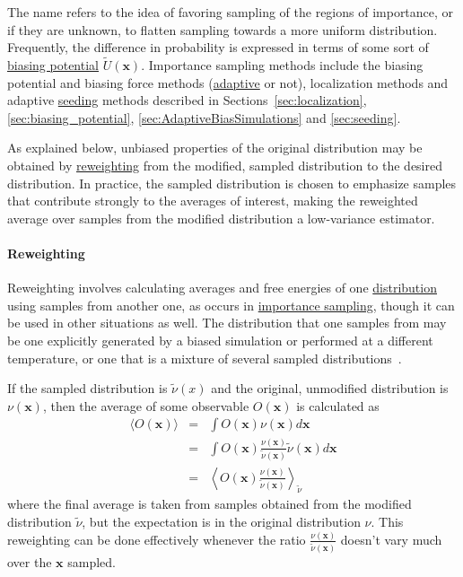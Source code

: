 \documentclass[9pt,review]{livecoms}
\newcommand{\vx}{\mathbf{x}}
\begin{document}

The name refers to the idea of favoring sampling of the regions of importance, or if they are unknown, to flatten sampling towards a more uniform distribution. Frequently, the difference in probability is expressed in terms of some sort of \hyperlink{ref:biasingE} {biasing potential} $\tilde U(\vx)$. Importance sampling methods include the biasing potential and biasing force methods (\hyperlink{ref:Adaptive} {adaptive} or not), localization methods and adaptive \hyperlink{ref:Seeding} {seeding} methods described in Sections~\ref{sec:localization}, \ref{sec:biasing_potential}, \ref{sec:AdaptiveBiasSimulations} and \ref{sec:seeding}.

As explained below, unbiased properties of the original distribution may be obtained by \hyperlink{ref:Reweighting} {reweighting} from the modified, sampled distribution to the desired distribution.
In practice, the  sampled distribution is chosen to emphasize samples that contribute strongly to the averages of interest, making the reweighted average over samples from the modified distribution a low-variance estimator.


\hypertarget{ref:Reweighting} {\paragraph{Reweighting}}
Reweighting involves calculating averages and free energies of one \hyperlink{ref:Distribution} {distribution} using samples from another one, as occurs in \hyperlink{ref:IS} {importance sampling}, though it can be used in other situations as well. The distribution that one samples from  may be one explicitly generated by a biased simulation or performed at a different temperature, or one that is a mixture of several sampled distributions~\cite{reweighting_mixture_distribution}.

If the sampled distribution is $\tilde \nu(x)$ and the original, unmodified distribution is $\nu(\vx)$, then the average of some observable $O(\vx)$ is calculated as
\begin{eqnarray}
\langle O(\vx) \rangle &=& \int  O(\vx) \nu(\vx) d\vx \nonumber \\
&=& \int O(\vx) \frac{\nu(\vx)}{\tilde \nu(\vx)} \tilde \nu(\vx) d\vx\nonumber \\
&=& \left \langle O(\vx)  \frac{\nu(\vx)}{\tilde{\nu}(\vx)} \right \rangle_{\tilde \nu}
\end{eqnarray}
where the final average is taken from samples obtained from the modified distribution $\tilde \nu$, but the expectation is in the original distribution $\nu$.  This reweighting can be done effectively whenever the ratio $\frac{\nu(\vx)}{\tilde \nu(\vx)}$ doesn't vary much over the $\vx$ sampled.
\end{document}
